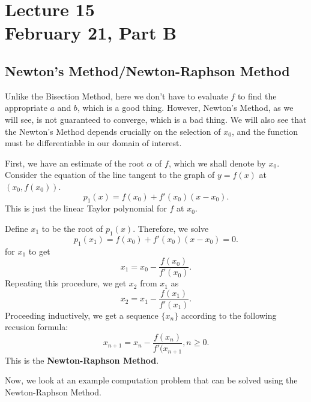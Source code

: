 \chapter*{Lecture 15 \\ February 21, Part B}
\setcounter{chapter}{15}
\setcounter{section}{0}

\section{Newton's Method/Newton-Raphson Method}

Unlike the Bisection Method, here we don't have to evaluate $f$ to find the appropriate  $a$ and  $b$, which is a good thing. However, Newton's Method, as we will see, is not guaranteed to converge, which is a bad thing. We will also see that the Newton's Method depends crucially on the selection of $x_0$, and the function must be differentiable in our domain of interest.

First, we have an estimate of the root $\alpha$ of $f$, which we shall denote by  $ x_0$.
Consider the equation of the line tangent to the graph of $y = f(x)$ at $(x_0, f(x_0))$.
\[
p_1(x) = f(x_0) + f'(x_0)\left( x-x_0 \right)   
.\] 
This is just the linear Taylor polynomial for $f$ at  $ x_0$.

Define $ x_1$ to be the root of $ p_1(x)$. Therefore, we solve 
\[
p_1(x_1) = f(x_0) + f'(x_0)(x-x_0) = 0
.\] 
for $ x_1$ to get 
\[
x_1 = x_0 - \frac{f(x_0)}{f'(x_0)}
.\] 
Repeating this procedure, we get $ x_2$ from $ x_1$ as 
\[
x_2 = x_1 - \frac{f(x_1)}{f'(x_1)}
.\] 
Proceeding inductively, we get a sequence $\{x_n\}$ according to the following recusion formula:
 \[
	 x_{n+1} = x_n - \frac{f(x_n)}{f'(x_{n+1}}, n \geq 0
.\] 
This is the \textbf{Newton-Raphson Method}.

Now, we look at an example computation problem that can be solved using the Newton-Raphson Method.

